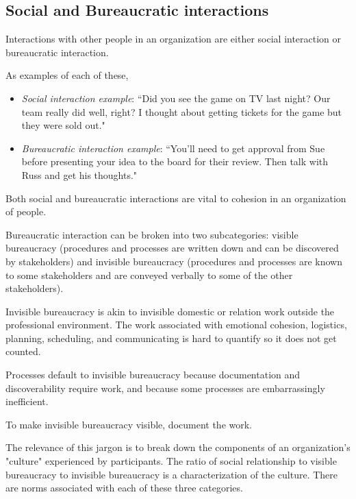 
\subsection{Social and Bureaucratic interactions\label{sec:socializing}}

Interactions with other people in an organization are either social interaction or bureaucratic interaction. 

As examples of each of these,
\begin{itemize}
\item \textit{Social interaction example}: ``Did you see the game on TV last night? Our team really did well, right? I thought about getting tickets for the game but they were sold out."
\item \textit{Bureaucratic interaction example}: ``You'll need to get approval from Sue before presenting your idea to the board for their review. Then talk with Russ and get his thoughts."
\end{itemize}
Both social and bureaucratic interactions are vital to cohesion in an organization of people. 


Bureaucratic interaction can be broken into two subcategories: \gls{visible bureaucracy} (procedures and processes are written down and can be discovered by stakeholders)  and \gls{invisible bureaucracy} (procedures and processes are known to some stakeholders and are conveyed verbally to some of the other stakeholders).

Invisible bureaucracy is akin to invisible domestic or relation work outside the professional environment. The work associated with emotional cohesion, logistics, planning, scheduling, and communicating is hard to quantify so it does not get counted.

Processes default to invisible bureaucracy because documentation and discoverability require work, and because some processes are embarrassingly inefficient. 

To make invisible bureaucracy visible, document the work.


The relevance of this jargon is to break down the components of an organization's "culture" experienced by participants. The ratio of social relationship to visible bureaucracy to invisible bureaucracy is a characterization of the culture. There are norms associated with each of these three categories.
